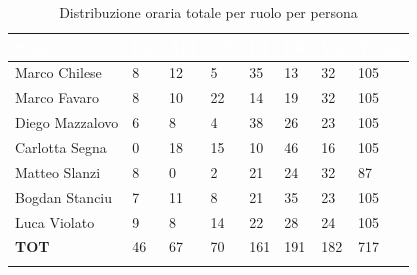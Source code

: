 \begin{longtable}{|C{.30\textwidth}|C{.06\textwidth}|C{.06\textwidth}|C{.06\textwidth} | C{.06\textwidth}| C{.06\textwidth} | C{.06\textwidth} | C{.10\textwidth} |}
	\hline
		\textbf{\textcolor{white}{Nome}} & \textbf{\textcolor{white}{RE}} & \textbf{\textcolor{white}{AM}} & \textbf{\textcolor{white}{AN}} & \textbf{\textcolor{white}{PJ}} & \textbf{\textcolor{white}{PR}} & \textbf{\textcolor{white}{VE}} & \textbf{\textcolor{white}{Totale}}\\
	\hline \hline
	
	Marco Chilese & 8 & 12 & 5 & 35 & 13 & 32 & 105\\
	\hline
	Marco Favaro & 8 & 10 & 22 & 14 & 19 & 32 & 105 \\
	\hline
	Diego Mazzalovo & 6 & 8 & 4 & 38 & 26  & 23 & 105\\
	\hline
	Carlotta Segna & 0 & 18 & 15 & 10 & 46 & 16 & 105\\
	\hline
	Matteo Slanzi & 8 & 0 & 2 & 21 & 24 & 32 & 87\\
	\hline
	Bogdan Stanciu & 7 & 11 & 8 & 21 & 35 & 23 & 105 \\
	\hline
	Luca Violato & 9 & 8 & 14 & 22 & 28 & 24 & 105\\
	\hline
	\textbf{TOT} & 46 & 67 & 70 & 161 & 191 & 182 & 717\\
	\hline
	\caption{Distribuzione oraria totale per ruolo per persona}
	\label{orePersona}
\end{longtable}

